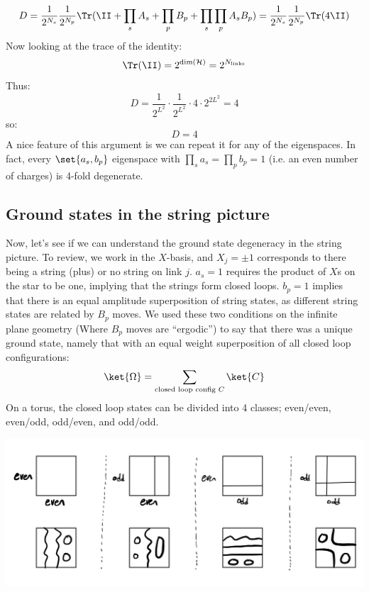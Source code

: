 \begin{equation}
    D = \frac{1}{2^{N_s}}\frac{1}{2^{N_p}}\Tr(\II + \prod_s A_s + \prod_p B_p + \prod_s\prod_p A_sB_p) = \frac{1}{2^{N_s}}\frac{1}{2^{N_p}}\Tr(4\II)
\end{equation}
Now looking at the trace of the identity:
\begin{equation}
    \Tr(\II) = 2^{\text{dim}(\mathcal{H})} = 2^{N_{\text{links}}}
\end{equation}
Thus:
\begin{equation}
    D = \frac{1}{2^{L^2}}\cdot \frac{1}{2^{L^2}} \cdot 4 \cdot 2^{2L^2} = 4
\end{equation}
so:
\begin{equation}
    \boxed{D = 4}
\end{equation}
A nice feature of this argument is we can repeat it for any of the eigenspaces. In fact, every $\set{a_s, b_p}$ eigenspace with $\prod_s a_s = \prod_p b_p = 1$ (i.e. an even number of charges) is 4-fold degenerate. 

\subsection{Ground states in the string picture}

Now, let's see if we can understand the ground state degeneracy in the string picture. To review, we work in the $X$-basis, and $X_j = \pm 1$ corresponds to there being a string (plus) or no string on link $j$. $a_s = 1$ requires the product of $X$s on the star to be one, implying that the strings form closed loops. $b_p = 1$  implies that there is an equal amplitude superposition of string states, as different string states are related by $B_p$ moves. We used these two conditions on the infinite plane geometry (Where $B_p$ moves are ``ergodic'') to say that there was a unique ground state, namely that with an equal weight superposition of all closed loop configurations:
\begin{equation}
    \ket{\Omega} = \sum_{\text{closed loop config $C$}}\ket{C}
\end{equation}
On a torus, the closed loop states can be divided into 4 classes; even/even, even/odd, odd/even, and odd/odd. 

\begin{center}
    \includegraphics[scale=0.4]{Lectures/Images/lec2-evenodd.png}
\end{center}

